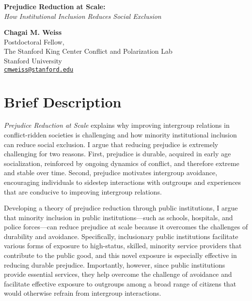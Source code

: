 \documentclass[12pt]{article}
\theoremstyle{plain}
\begin{document}





\begin{center}
\singlespace
\large{\textbf{Prejudice Reduction at Scale:}\\
\emph{How Institutional Inclusion Reduces Social Exclusion}}\\
\doublespacing

\normalsize{
\begin{singlespace}
\textbf{Chagai M. Weiss}\\
Postdoctoral Fellow, \\
The Stanford King Center Conflict and Polarization Lab\\
Stanford University\\
\href{cmweiss@stanford.edu}{\texttt{cmweiss@stanford.edu}}
\end{singlespace}}
\end{center}
\onehalfspacing



\section*{Brief Description}
\emph{Prejudice Reduction at Scale} explains why improving intergroup relations in conflict-ridden societies is challenging and how minority institutional inclusion can reduce social exclusion. I argue that reducing prejudice is extremely challenging for two reasons. First, prejudice is durable, acquired in early age socialization, reinforced by ongoing dynamics of conflict, and therefore extreme and stable over time. Second, prejudice motivates intergroup avoidance, encouraging individuals to sidestep interactions with outgroups and experiences that are conducive to improving intergroup relations.

Developing a theory of prejudice reduction through public institutions, I argue that minority inclusion in public institutions---such as schools, hospitals, and police forces---can reduce prejudice at scale because it overcomes the challenges of durability and avoidance. Specifically, inclusionary public institutions facilitate various forms of exposure to high-status, skilled, minority service providers that contribute to the public good, and this novel exposure is especially effective in reducing durable prejudice. Importantly, however, since public institutions provide essential services, they help overcome the challenge of avoidance and facilitate effective exposure to outgroups among a broad range of citizens that would otherwise refrain from intergroup interactions.
\end{document}
